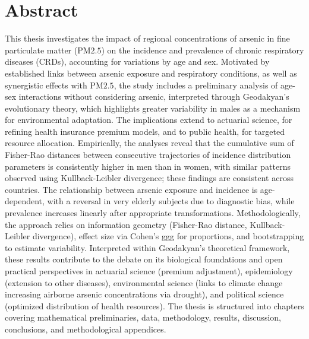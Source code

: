 \section{Abstract}

This thesis investigates the impact of regional concentrations of arsenic in fine particulate matter (PM${2.5}$) on the incidence and prevalence of chronic respiratory diseases (CRDs), accounting for variations by age and sex. Motivated by established links between arsenic exposure and respiratory conditions, as well as synergistic effects with PM${2.5}$, the study includes a preliminary analysis of age-sex interactions without considering arsenic, interpreted through Geodakyan’s evolutionary theory, which highlights greater variability in males as a mechanism for environmental adaptation.
The implications extend to actuarial science, for refining health insurance premium models, and to public health, for targeted resource allocation.
Empirically, the analyses reveal that the cumulative sum of Fisher-Rao distances between consecutive trajectories of incidence distribution parameters is consistently higher in men than in women, with similar patterns observed using Kullback-Leibler divergence; these findings are consistent across countries. The relationship between arsenic exposure and incidence is age-dependent, with a reversal in very elderly subjects due to diagnostic bias, while prevalence increases linearly after appropriate transformations. Methodologically, the approach relies on information geometry (Fisher-Rao distance, Kullback-Leibler divergence), effect size via Cohen’s ggg for proportions, and bootstrapping to estimate variability.
Interpreted within Geodakyan’s theoretical framework, these results contribute to the debate on its biological foundations and open practical perspectives in actuarial science (premium adjustment), epidemiology (extension to other diseases), environmental science (links to climate change increasing airborne arsenic concentrations via drought), and political science (optimized distribution of health resources). The thesis is structured into chapters covering mathematical preliminaries, data, methodology, results, discussion, conclusions, and methodological appendices.